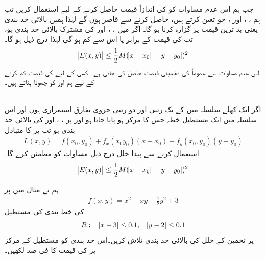 جب ہم اس عدم مساوات کو   کی اندازاً قیمت حاصل کرنے کے لیے استعمال کریں تب ہم ،  ، اور ، جو  تعین کرتے ہیں،  حاصل کرنے سے قاصر ہوں گے لہٰذا ہمیں  بالائی حد بندی  یعنی  بد ترین قیمت  پر گزارہ کرنا ہو گا۔   اگر    میں  ،  ، اور     کی مشترک بالائی حد بندی  ہو، تب  کی قیمت  کے برابر یا اس سے کم ہو گی لہٰذا درج ذیل ہو گا۔
\begin{align*}
\abs{E(x,y)}\le\frac{1}{2}M(\abs{x-x_0}+\abs{y-y_0})^2
\end{align*}
اس  عدم مساوات سے عموماً   کی  تخمینی  قیمت حاصل کی جاتی ہے۔  کسی  کے لیے  کی قیمت کم کرنے کے لیے ہم  اور  کو چھوٹا بناتے ہیں۔

\\
اگر   ایک  کھلے   سلسلہ  میں  کے یک رتبی اور دو رتبی جزوی تفارق استمراری ہوں اور اس سلسلہ   میں ایک  مستطیل خطہ    جس کا مرکز  ہو پایا جاتا ہو  اور  پر ، ،  اور   کی بالائی حد  بندی  ہو   تب    پر  کا متبادل 
\begin{align*}
L(x,y)=f(x_0,y_0)+f_x(x_0y_0)(x-x_0)+f_y(x_0,y_0)(y-y_0)
\end{align*}
استعمال کرنے سے پیدا خلل  درج ذیل مساوات کو مطمئن کرے گا۔
\begin{align}\label{مساوات_کثیرالمتغیر_بالائی_حد_بندی_عدم_مساوات}
\abs{E(x,y)}\le \frac{1}{2}M(\abs{x-x_0}+\abs{y-y_0})^2
\end{align}


ہم نے مثال  میں  پر 
\begin{align*}
f(x,y)=x^2-xy+\frac{1}{2}y^2+3
\end{align*}
 کی خط بندی کی۔مستطیل 
\begin{align*}
R:\quad \abs{x-3}\le 0.1,\quad \abs{y-2}\le 0.1
\end{align*}
پر تخمین  کے خلل کی بالائی حد بندی  تلاش کریں۔اس حد بندی کو  مستطیل کے مرکز پر   کی قیمت  کا فی صد لکھیں۔

